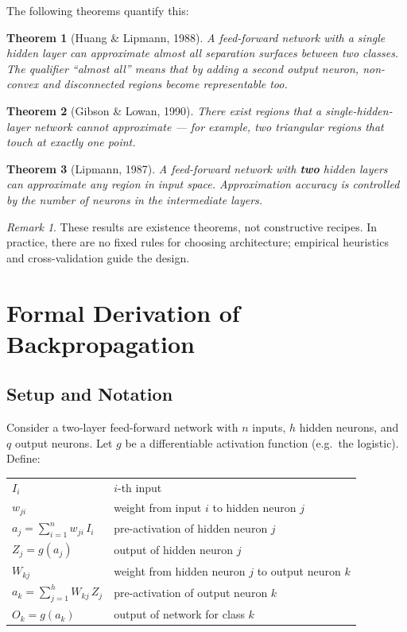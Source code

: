 \documentclass[11pt,a4paper]{article}
\theoremstyle{definition}
\theoremstyle{plain}
\newtheorem{theorem}{Theorem}[section]
\theoremstyle{remark}
\newtheorem*{remark}{Remark}
\begin{document}
The following theorems quantify this:

\begin{theorem}[Huang \& Lipmann, 1988]
A feed-forward network with a single hidden layer can approximate \textit{almost all} separation surfaces between two classes. The qualifier ``almost all'' means that by adding a second output neuron, non-convex and disconnected regions become representable too.
\end{theorem}

\begin{theorem}[Gibson \& Lowan, 1990]
There exist regions that a single-hidden-layer network cannot approximate --- for example, two triangular regions that touch at exactly one point.
\end{theorem}

\begin{theorem}[Lipmann, 1987]
A feed-forward network with \textbf{two} hidden layers can approximate any region in input space. Approximation accuracy is controlled by the number of neurons in the intermediate layers.
\end{theorem}

\begin{remark}
These results are existence theorems, not constructive recipes. In practice, there are no fixed rules for choosing architecture; empirical heuristics and cross-validation guide the design.
\end{remark}


\section{Formal Derivation of Backpropagation}

\subsection{Setup and Notation}

Consider a two-layer feed-forward network with $n$ inputs, $h$ hidden neurons, and $q$ output neurons. Let $g$ be a differentiable activation function (e.g.\ the logistic). Define:

\begin{center}
\renewcommand{\arraystretch}{1.4}
\begin{tabular}{ll}
    $I_i$      & $i$-th input \\
    $w_{ji}$   & weight from input $i$ to hidden neuron $j$ \\
    $a_j = \displaystyle\sum_{i=1}^n w_{ji}\,I_i$     & pre-activation of hidden neuron $j$ \\
    $Z_j = g(a_j)$                                     & output of hidden neuron $j$ \\
    $W_{kj}$   & weight from hidden neuron $j$ to output neuron $k$ \\
    $a_k = \displaystyle\sum_{j=1}^h W_{kj}\,Z_j$     & pre-activation of output neuron $k$ \\
    $O_k = g(a_k)$                                     & output of network for class $k$
\end{tabular}
\end{center}
\end{document}
